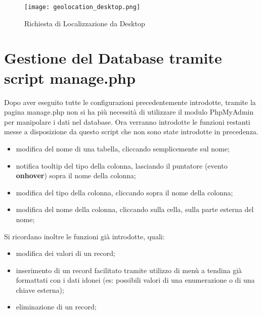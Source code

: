 \begin{figure}[H]
	\centering
	\caption{Richiesta di Localizzazione da Desktop}
	\label{fig:geolocation_desktop}
	\texttt{[image: geolocation\_desktop.png]}
\end{figure} 

\newpage

\section{Gestione del Database tramite script manage.php}
Dopo aver eseguito tutte le configurazioni precedentemente introdotte, tramite la pagina manage.php non si ha più necessità di utilizzare il modulo PhpMyAdmin per manipolare i dati nel database. \newline
Ora verranno introdotte le funzioni restanti messe a disposizione da questo script che non sono state introdotte in precedenza.
\begin{itemize}
\item modifica del nome di una tabella, cliccando semplicemente sul nome;
\item notifica tooltip del tipo della colonna, lasciando il puntatore (evento \textbf{onhover}) sopra il nome della colonna;
\item modifica del tipo della colonna, cliccando sopra il nome della colonna;
\item modifica del nome della colonna, cliccando sulla cella, sulla parte esterna del nome;
\end{itemize}
Si ricordano inoltre le funzioni già introdotte, quali:
\begin{itemize}
\item modifica dei valori di un record;
\item inserimento di un record facilitato tramite utilizzo di menù a tendina già formattati con i dati idonei (es: possibili valori di una enumerazione o di una chiave esterna);
\item eliminazione di un record;
\end{itemize}




